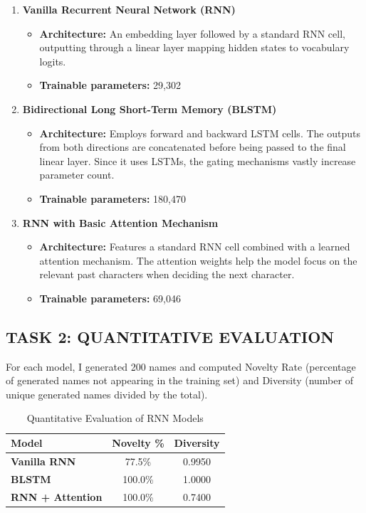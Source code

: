 \documentclass{article}
\begin{document}
\begin{enumerate}
    \item \textbf{Vanilla Recurrent Neural Network (RNN)}
    \begin{itemize}
        \item \textbf{Architecture:} An embedding layer followed by a standard RNN cell, outputting through a linear layer mapping hidden states to vocabulary logits.
        \item \textbf{Trainable parameters:} 29,302
    \end{itemize}

    \item \textbf{Bidirectional Long Short-Term Memory (BLSTM)}
    \begin{itemize}
        \item \textbf{Architecture:} Employs forward and backward LSTM cells. The outputs from both directions are concatenated before being passed to the final linear layer. Since it uses LSTMs, the gating mechanisms vastly increase parameter count.
        \item \textbf{Trainable parameters:} 180,470
    \end{itemize}

    \item \textbf{RNN with Basic Attention Mechanism}
    \begin{itemize}
        \item \textbf{Architecture:} Features a standard RNN cell combined with a learned attention mechanism. The attention weights help the model focus on the relevant past characters when deciding the next character. 
        \item \textbf{Trainable parameters:} 69,046
    \end{itemize}
\end{enumerate}

\subsection*{TASK 2: QUANTITATIVE EVALUATION}

For each model, I generated 200 names and computed Novelty Rate (percentage of generated names not appearing in the training set) and Diversity (number of unique generated names divided by the total).

\begin{table}[htbp]
\begin{tabular}{|l|c|c|}
\hline
\textbf{Model} & \textbf{Novelty \%} & \textbf{Diversity} \\ \hline
\textbf{Vanilla RNN} & 77.5\% & 0.9950 \\ \hline
\textbf{BLSTM} & 100.0\% & 1.0000 \\ \hline
\textbf{RNN + Attention} & 100.0\% & 0.7400 \\ \hline
\end{tabular}
\caption{Quantitative Evaluation of RNN Models}
\end{table}
\end{document}
